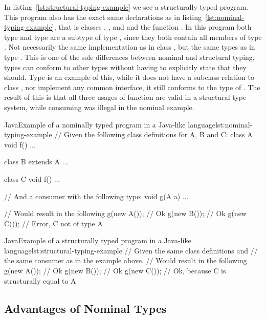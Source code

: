 In listing~\vref{lst:structural-typing-example} we see a structurally typed program.
This program also has the exact same declarations as in listing~\vref{lst:nominal-typing-example}, that is classes , , and  and the function .
In this program both type  and type  are a subtype of type , since they both contain all members of type .
Not necessarily the same implementation as in class , but the same types as in type .
This is one of the sole differences between nominal and structural typing, types can conform to other types without having to explicitly state that they should.
Type  is an example of this, while it does not have a subclass relation to class , nor implement any common interface, it still conforms to the type of .
The result of this is that all three usages of function  are valid in a structural type system, while consuming  was illegal in the nominal example.


\begin{code}{Java}{Example of a nominally typed program in a Java-like language}{lst:nominal-typing-example}
    // Given the following class definitions for A, B and C:
    class A {
        void f() {
            ...
        }
    }

    class B extends A {
        ...
    }

    class C {
        void f() {
            ...
        }
    }

    // And a consumer with the following type:
    void g(A a) { ... }

    // Would result in the following
    g(new A()); // Ok
    g(new B()); // Ok
    g(new C()); // Error, C not of type A
\end{code}

\begin{code}{Java}{Example of a structurally typed program in a Java-like language}{lst:structural-typing-example}
    // Given the same class definitions and
    // the same consumer as in the example above.
    // Would result in the following
    g(new A()); // Ok
    g(new B()); // Ok
    g(new C()); // Ok, because C is structurally equal to A
\end{code}

\subsection{Advantages of Nominal Types}\label{subsec:advantages-of-nominal-types}

